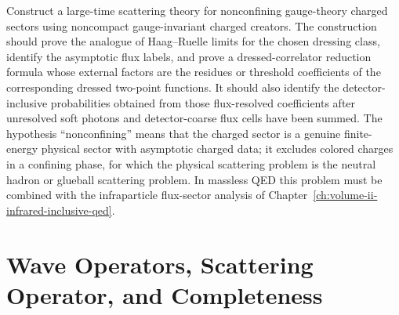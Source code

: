 \begin{openproblem}
\label{op:haag-ruelle-lsz-dressed-charged-sectors}
Construct a large-time scattering theory for nonconfining gauge-theory
charged sectors using noncompact gauge-invariant charged creators.  The
construction should prove the analogue of Haag--Ruelle limits for the chosen
dressing class, identify the asymptotic flux labels, and prove a
dressed-correlator reduction formula whose external factors are the residues
or threshold coefficients of the corresponding dressed two-point functions.
It should also identify the detector-inclusive probabilities obtained from
those flux-resolved coefficients after unresolved soft photons and
detector-coarse flux cells have been summed.
The hypothesis ``nonconfining'' means that the charged sector is a genuine
finite-energy physical sector with asymptotic charged data; it excludes
colored charges in a confining phase, for which the physical scattering
problem is the neutral hadron or glueball scattering problem.  In massless QED
this problem must be combined with the infraparticle flux-sector analysis of
Chapter~\ref{ch:volume-ii-infrared-inclusive-qed}.
\end{openproblem}

\section{Wave Operators, Scattering Operator, and Completeness}

